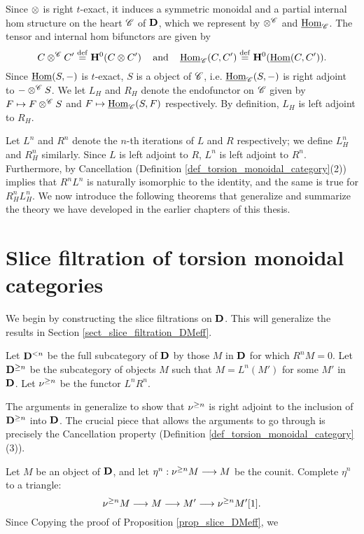 Since $\otimes$ is right $t$-exact, it induces a symmetric 
monoidal and a partial internal hom structure on the heart 
$\mathscr{C}$ of $\mathbf{D}$, which we represent by $\otimes^{\mathscr{C}}$ 
and $\underline{\mathrm{Hom}}_{\mathscr{C}}$. The tensor and internal hom bifunctors
are given by
\[
C \otimes^{\mathscr{C}} C' \stackrel{\mathrm{def}}{=} \mathbf{H}^0(C \otimes C') 
   \;\;\;\textrm{ and }\;\;\;
\underline{\mathrm{Hom}}_{\mathscr{C}}(C, C') \stackrel{\mathrm{def}}{=} \mathbf{H}^0(\underline{\mathrm{Hom}}(C, C')).
\]
Since $\underline{\mathrm{Hom}}(S, -)$ is $t$-exact, $S$ is a \SemiInvertible
object of $\mathscr{C}$, i.e. $\underline{\mathrm{Hom}}_{\mathscr{C}}(S, -)$ is right
adjoint to $- \otimes^{\mathscr{C}} S$. We let $L_H$ and $R_H$ denote 
the endofunctor on $\mathscr{C}$ given by $F \mapsto F 
\otimes^{\mathscr{C}} S$ and $F \mapsto \underline{\mathrm{Hom}}_{\mathscr{C}}(S, F)$ 
respectively. By definition, $L_H$ is left adjoint to $R_H$.

Let $L^n$ and $R^n$ denote the $n$-th iterations of $L$ and $R$ 
respectively; we define $L_H^n$ and $R_H^n$ similarly. Since $L$
is left adjoint to $R$,
$L^n$ is left adjoint to $R^n$. Furthermore, by Cancellation 
(Definition \ref{def_torsion_monoidal_category}(2)) implies that 
$R^nL^n$ is naturally isomorphic to the identity, and the same is 
true for $R_H^nL_H^n$. We now introduce the following theorems 
that generalize and summarize the theory we have developed in the
earlier chapters of this thesis.

\section{Slice filtration of torsion monoidal categories}
\label{sect_summary_slice_filt_on_DCat}

We begin by constructing the slice filtrations on $\mathbf{D}$. This
will generalize the results in Section 
\ref{sect_slice_filtration_DMeff}.

\begin{defn}
Let $\mathbf{D}^{< n}$ be the full subcategory of $\mathbf{D}$ by those 
$M$ in $\mathbf{D}$ for which $R^n M = 0$. Let $\mathbf{D}^{\geq n}$ be 
the subcategory of objects $M$ such that $M = L^n(M')$ for some 
$M'$ in $\mathbf{D}$. Let $\nu^{\geq n}$ be the functor  $L^nR^n$.
\end{defn}

The arguments in \cite[1.1]{HuKa} generalize to show that 
$\nu^{\geq n}$ is right adjoint to the inclusion of 
$\mathbf{D}^{\geq n}$ into $\mathbf{D}$. The crucial piece that
allows the arguments to go through is precisely the Cancellation
property (Definition \ref{def_torsion_monoidal_category} (3)).

Let $M$ be an object of $\mathbf{D}$, and let $\eta^n : \nu^{\geq n} M 
\longrightarrow M$ be the counit. Complete $\eta^n$ to a triangle:
\[
\nu^{\geq n} M \longrightarrow M \longrightarrow M' \longrightarrow \nu^{\geq n} M'[1].
\]
Since 
Copying the proof of Proposition \ref{prop_slice_DMeff}, we 

